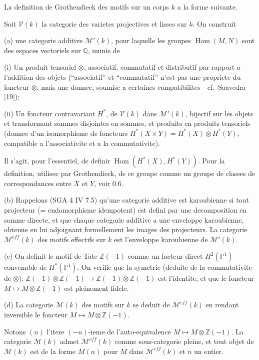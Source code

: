 \documentclass[12pt,a4paper]{article}
\theoremstyle{plain}
\theoremstyle{definition}
\theoremstyle{remark}
\DeclareMathOperator{\Hom}{Hom}
\newcommand{\Q}{\mathbb{Q}}
\newcommand{\Z}{\mathbb{Z}}
\newcommand{\PP}{\mathbb{P}}
\begin{document}
La definition de Grothendieck des motifs sur un corps $k$ a la forme suivante.

Soit $\mathcal{V}(k)$ la categorie des varietes projectives et lisses sur $k$. On construit

(a) une categorie additive $\mathcal{M}'(k)$, pour laquelle les groupes $\Hom(M, N)$ sont des
espaces vectoriels sur $\Q$, munie de

\quad (i) Un produit tensoriel $\otimes$, associatif, commutatif et distributif par rapport a
l'addition des objets (``associatif'' et ``commutatif'' n'est pas une propriete du foncteur
$\otimes$, mais une donnee, soumise a certaines compatibilites---cf.~Saavedra [19]);

\quad (ii) Un foncteur contravariant $H^*$, de $\mathcal{V}(k)$ dans $\mathcal{M}'(k)$, bijectif sur les objets et
transformant sommes disjointes en sommes, et produits en produits tensoriels
(donnee d'un isomorphisme de foncteurs $H^*(X \times Y) = H^*(X) \otimes H^*(Y)$,
compatible a l'associativite et a la commutativite).

Il s'agit, pour l'essentiel, de definir $\Hom(H^*(X), H^*(Y))$. Pour la definition, utilisee
par Grothendieck, de ce groupe comme un groupe de classes de correspondances
entre $X$ et $Y$, voir 0.6.

(b) Rappelons (SGA 4 IV 7.5) qu'une categorie additive est karoubienne si tout
projecteur (= endomorphisme idempotent) est defini par une decomposition en
somme directe, et que chaque categorie additive a une enveloppe karoubienne,
obtenue en lui adjoignant formellement les images des projecteurs. La categorie
$\mathcal{M}^{eff}(k)$ des motifs effectifs sur $k$ est l'enveloppe karoubienne de $\mathcal{M}'(k)$.

(c) On definit le motif de Tate $\Z(-1)$ comme un facteur direct $H^2(\PP^1)$ convenable
de $H^*(\PP^1)$. On verifie que la symetrie (deduite de la commutativite de $\otimes$):
$\Z(-1) \otimes \Z(-1) \to \Z(-1) \otimes \Z(-1)$ est l'identite, et que le foncteur
$M \mapsto M \otimes \Z(-1)$ est pleinement fidele.

(d) La categorie $\mathcal{M}(k)$ des motifs sur $k$ se deduit de $\mathcal{M}^{eff}(k)$ en rendant inversible
le foncteur $M \mapsto M \otimes \Z(-1)$.

Notons $(n)$ l'itere $(-n)$-ieme de l'auto-equivalence $M \mapsto M \otimes \Z(-1)$. La categorie
$\mathcal{M}(k)$ admet $\mathcal{M}^{eff}(k)$ comme sous-categorie pleine, et tout objet de $\mathcal{M}(k)$ est
de la forme $M(n)$ pour $M$ dans $\mathcal{M}^{eff}(k)$ et $n$ un entier.
\end{document}

